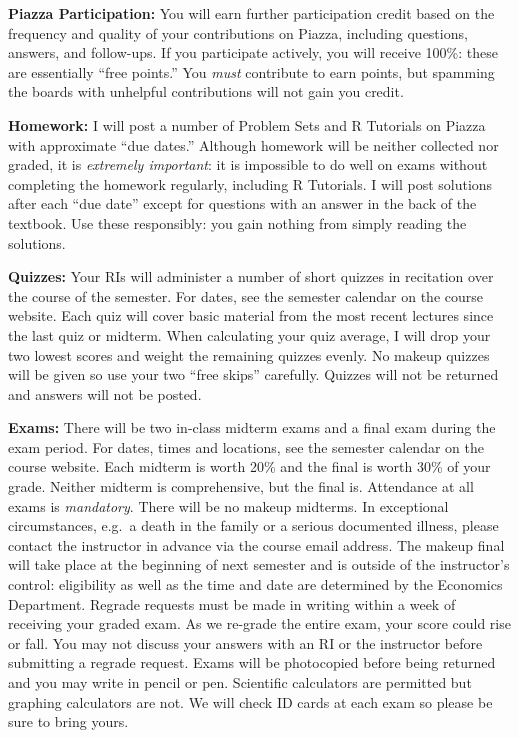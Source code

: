 \documentclass[11pt, letterpaper]{article}
\begin{document}
\medskip

\noindent \textbf{Piazza Participation:} 
You will earn further participation credit based on the frequency and quality of your contributions on Piazza, including questions, answers, and follow-ups. 
If you participate actively, you will receive 100\%: these are essentially ``free points.''  
You \emph{must} contribute to earn points, but spamming the boards with unhelpful contributions will not gain you credit.  


\medskip



\noindent \textbf{Homework:} 
I will post a number of Problem Sets and R Tutorials on Piazza with approximate ``due dates.'' 
Although homework will be neither collected nor graded, it is \emph{extremely important}: it is impossible to do well on exams without completing the homework regularly, including R Tutorials. 
I will post solutions after each ``due date'' except for questions with an answer in the back of the textbook. 
Use these responsibly: you gain nothing from simply reading the solutions.


\medskip

\noindent \textbf{Quizzes:} 
Your RIs will administer a number of  short quizzes in recitation over the course of the semester. 
For dates, see the semester calendar on the course website.
Each quiz will cover basic material from the most recent lectures since the last quiz or midterm. 
When calculating your quiz average, I will drop your two lowest scores and weight the remaining quizzes evenly. 
No makeup quizzes will be given so use your two ``free skips'' carefully.
Quizzes will not be returned and answers will not be posted.

\medskip

\noindent \textbf{Exams:} 
There will be two in-class midterm exams and a final exam during the exam period.
For dates, times and locations, see the semester calendar on the course website.
Each midterm is worth 20\% and the final is worth 30\% of your grade.
Neither midterm is comprehensive, but the final is.  
Attendance at all exams is \emph{mandatory}.
There will be no makeup midterms. 
In exceptional circumstances, e.g.\ a death in the family or a serious documented illness, please contact the instructor in advance via the course email address.
The makeup final will take place at the beginning of next semester and is outside of the instructor's control: eligibility as well as the time and date are determined by the Economics Department. 
Regrade requests must be made in writing within a week of receiving your graded exam. 
As we re-grade the entire exam, your score could rise or fall. 
You may not discuss your answers with an RI or the instructor before submitting a regrade request. 
Exams will be photocopied before being returned and you may write in pencil or pen. 
Scientific calculators are permitted but graphing calculators are not. 
We will check ID cards at each exam so please be sure to bring yours. 
            
\end{document}
